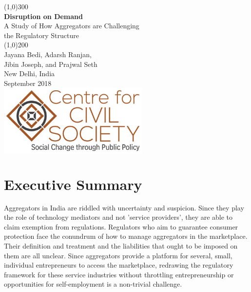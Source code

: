 \documentclass[a4paper, 12pt, twoside]{article}
\begin{document}
                    
\begin{titlepage}
\begin{center}
\line(1,0){300}\\
[0.25in]
\huge{\bfseries \textcolor{CCSbrown} {Disruption on Demand}} \\
[0.5cm]
\large{A Study of How Aggregators are Challenging \\ the Regulatory Structure} \\
    	
\line(1,0){200}\\
[3in]
\LARGE{Jayana Bedi, Adarsh Ranjan, \\ Jibin Joseph, and Prajwal Seth} \\ 
[1.5cm]
{\normalsize New Delhi, India} \\
{\normalsize September 2018} \\
[1.85cm]
\includegraphics[width = 75mm]{CCSlogo.jpg}

\end{center}
\end{titlepage}

                    \tableofcontents
                    
      
                    
                    \newpage
                    \section*{Executive Summary}
                   Aggregators in India are riddled with uncertainty and suspicion. Since they play the role of technology mediators and not 'service providers', they are able to claim exemption from regulations. Regulators who aim to guarantee consumer protection face the conundrum of how to manage aggregators in the marketplace. Their definition and treatment and the liabilities that ought to be imposed on them are all unclear. Since aggregators provide a platform for several, small, individual entrepreneurs to access the marketplace, redrawing the regulatory framework for these service industries without throttling entrepreneurship or opportunities for self-employment is a non-trivial challenge. \\
                    
\end{document}

